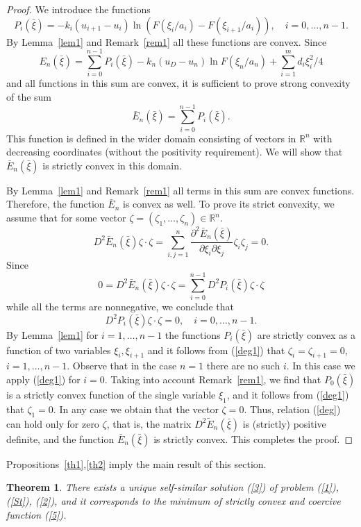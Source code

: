 \documentclass[12pt]{article}
\theoremstyle{plain}
\newtheorem{theorem}{Theorem}[section]
\theoremstyle{definition}
\numberwithin{equation}{section}
\newcommand{\R}{{\mathbb R}}
\begin{document}
\begin{proof}
We introduce the functions
\[P_i(\bar\xi)=-k_i(u_{i+1}-u_i)\ln (F(\xi_i/a_i)-F(\xi_{i+1}/a_i)), \quad i=0,\ldots,n-1.\]
By Lemma~\ref{lem1} and Remark~\ref{rem1} all these functions are convex.
Since
\[
E_n(\bar\xi)=\sum_{i=0}^{n-1} P_i(\bar\xi)-k_n(u_D-u_n)\ln F(\xi_n/a_n)+\sum_{i=1}^m d_i\xi_i^2/4
\]
and all functions in this sum are convex, it is sufficient to prove strong convexity of the sum
\[
\bar E_n(\bar\xi)=\sum_{i=0}^{n-1} P_i(\bar\xi).
\]
This function is defined in the wider domain consisting of vectors in $\R^n$ with decreasing coordinates (without the positivity requirement). We will show that $\bar E_n(\bar\xi)$ is strictly convex in this domain.

By Lemma~\ref{lem1} and Remark~\ref{rem1} all terms in this sum are convex functions. Therefore, the function $\bar E_n$ is convex as well. To prove its strict convexity, we assume that for some vector $\zeta=(\zeta_1,\ldots,\zeta_n)\in\R^n$.
\begin{equation}\label{deg}
D^2 \bar E_n(\bar\xi)\zeta\cdot\zeta=\sum_{i,j=1}^n \frac{\partial^2 \bar E_n(\bar\xi)}{\partial\xi_i\partial\xi_j}\zeta_i\zeta_j=0.
\end{equation}
Since
\[
0=D^2 \bar E_n(\bar\xi)\zeta\cdot\zeta=\sum_{i=0}^{n-1} D^2 P_i(\bar\xi)\zeta\cdot\zeta
\]
while all the terms are nonnegative, we conclude that
\begin{equation}\label{deg1}
D^2 P_i(\bar\xi)\zeta\cdot\zeta=0, \quad i=0,\ldots,n-1.
\end{equation}
By Lemma~\ref{lem1} for $i=1,\ldots,n-1$ the functions $P_i(\bar\xi)$ are strictly convex as a function of two variables $\xi_i,\xi_{i+1}$ and it follows from (\ref{deg1}) that $\zeta_i=\zeta_{i+1}=0$, $i=1,\ldots,n-1$. Observe that in the case $n=1$ there are no such $i$. In this case we apply (\ref{deg1}) for $i=0$. Taking into account Remark~\ref{rem1}, we find that $P_0(\bar\xi)$ is a strictly convex function of the single variable $\xi_1$, and it follows from (\ref{deg1}) that $\zeta_1=0$. In any case we obtain that the vector $\zeta=0$. Thus, relation (\ref{deg}) can hold only for zero $\zeta$, that is, the matrix $D^2\tilde E_n(\bar\xi)$ is (strictly) positive definite, and the function $\bar E_n(\bar\xi)$ is strictly convex. This completes the proof.
\end{proof}
Propositions~\ref{th1},\ref{th2} imply the main result of this section.

\begin{theorem}\label{th3}
There exists a unique self-similar solution (\ref{3}) of problem (\ref{1}), (\ref{St}), (\ref{2}), and it corresponds to the minimum of strictly convex and coercive function (\ref{5}).
\end{theorem}
\end{document}
